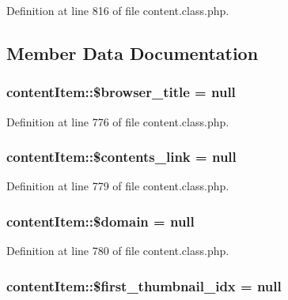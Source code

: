 Definition at line 816 of file content.\-class.\-php.



\subsection{Member Data Documentation}
\hypertarget{classcontentItem_abaf3b2f2d6878f8568161f4fce4e80bf}{
\subsubsection[{\$browser\-\_\-title}]{\setlength{\rightskip}{0pt plus 5cm}content\-Item\-::\$browser\-\_\-title = null}}\label{classcontentItem_abaf3b2f2d6878f8568161f4fce4e80bf}


Definition at line 776 of file content.\-class.\-php.

\hypertarget{classcontentItem_a6bf076b1d98025ee3f1d847fcf1fd29f}{
\subsubsection[{\$contents\-\_\-link}]{\setlength{\rightskip}{0pt plus 5cm}content\-Item\-::\$contents\-\_\-link = null}}\label{classcontentItem_a6bf076b1d98025ee3f1d847fcf1fd29f}


Definition at line 779 of file content.\-class.\-php.

\hypertarget{classcontentItem_a428d40bc2148eae5661822963ba819b4}{
\subsubsection[{\$domain}]{\setlength{\rightskip}{0pt plus 5cm}content\-Item\-::\$domain = null}}\label{classcontentItem_a428d40bc2148eae5661822963ba819b4}


Definition at line 780 of file content.\-class.\-php.

\hypertarget{classcontentItem_a3ed95afadefbe20bd085e1d88220f4b1}{
\subsubsection[{\$first\-\_\-thumbnail\-\_\-idx}]{\setlength{\rightskip}{0pt plus 5cm}content\-Item\-::\$first\-\_\-thumbnail\-\_\-idx = null}}\label{classcontentItem_a3ed95afadefbe20bd085e1d88220f4b1}


